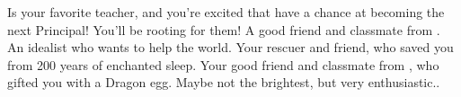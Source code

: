 \documentclass[char]{GL2020}
\begin{document}
\begin{contacts}
	\contact{\cMusic{}} Is your favorite teacher, and you’re excited that \cMusic{\they} have a chance at becoming the next Principal!  You’ll be rooting for them! 
	\contact{\cTechStar{}} A good friend and classmate from \pTech{}. An idealist who wants to help the world.
	\contact{\cWildCard{}} Your rescuer and friend, who saved you from 200 years of enchanted sleep.
	\contact{\cPirateChild{}} Your good friend and classmate from \pShip{}, who gifted you with a Dragon egg. Maybe not the brightest, but very enthusiastic..
	
\end{contacts}
\end{document}
